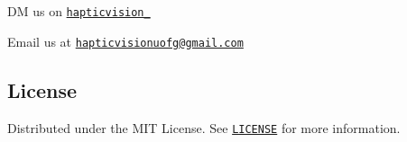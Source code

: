 \begin{DoxyItemize}
\item DM us on \href{https://www.instagram.com/hapticvision_/}{\tt hapticvision\+\_\+}
\item Email us at \href{mailto:hapticvisionuofg@gmail.com}{\tt hapticvisionuofg@gmail.\+com}
\end{DoxyItemize}

\subsection*{License}

Distributed under the M\+IT License. See \href{https://github.com/Haptic-Vision/haptic_vision/blob/main/LICENSE}{\tt L\+I\+C\+E\+N\+SE} for more information. 